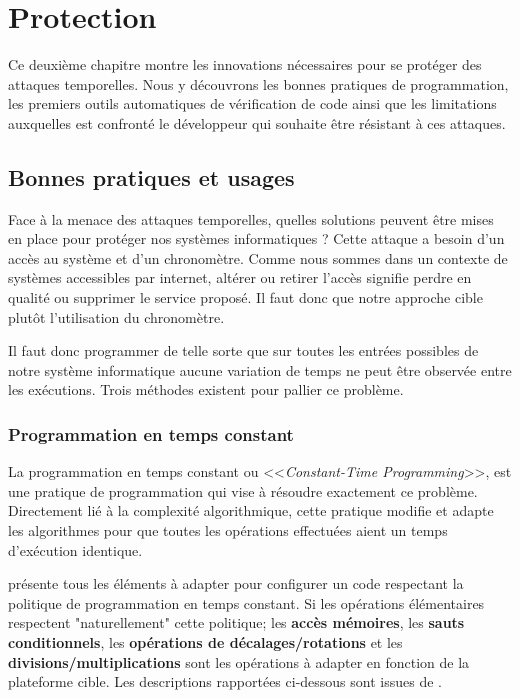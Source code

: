 \chapter{Protection}
\label{chap:constantTimeSolution}

Ce deuxième chapitre montre les innovations nécessaires pour se protéger des attaques temporelles. Nous y découvrons les bonnes pratiques de programmation, les premiers outils automatiques de vérification de code ainsi que les limitations auxquelles est confronté le développeur qui souhaite être résistant à ces attaques.


\section{Bonnes pratiques et usages}

Face à la menace des attaques temporelles, quelles solutions peuvent être mises en place pour protéger nos systèmes informatiques ? Cette attaque a besoin d'un accès au système et d'un chronomètre. Comme nous sommes dans un contexte de systèmes accessibles par internet, altérer ou retirer l'accès signifie perdre en qualité ou supprimer le service proposé. Il faut donc que notre approche cible plutôt l'utilisation du chronomètre.

Il faut donc programmer de telle sorte que sur toutes les entrées possibles de notre système informatique aucune variation de temps ne peut être observée entre les exécutions.
Trois méthodes existent pour pallier ce problème.\medbreak

\subsection*{Programmation en temps constant}
La programmation en temps constant ou <<\textit{Constant-Time Programming}>>, est une pratique de programmation qui vise à résoudre exactement ce problème. Directement lié à la complexité algorithmique, cette pratique modifie et adapte les algorithmes pour que toutes les opérations effectuées aient un temps d'exécution identique.

\citeauthor{BearSSL} \cite{BearSSL} présente tous les éléments à adapter pour configurer un code respectant la politique de programmation en temps constant. Si les opérations élémentaires respectent "naturellement" cette politique; les \textbf{accès mémoires}, les \textbf{sauts conditionnels}, les \textbf{opérations de décalages/rotations} et les \textbf{divisions/multiplications} sont les opérations à adapter en fonction de la plateforme cible. Les descriptions rapportées ci-dessous sont issues de \cite{BearSSL}.\smallbreak

